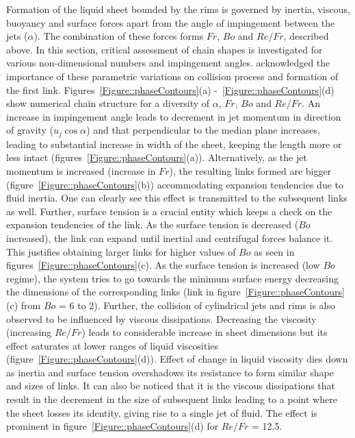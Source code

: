 \documentclass{jfm}
\begin{document}
Formation of the liquid sheet bounded by the rims is governed by inertia, viscous, buoyancy and surface forces apart from the angle of impingement between the jets ($\alpha$). The combination of these forces forms $Fr$, $Bo$ and $Re/Fr$, described above. In this section, critical assessment of chain shapes is investigated for various non-dimensional numbers and impingement angles. \cite{yang2014liquid} acknowledged the importance of these parametric variations on collision process and formation of the first link. Figures~\ref{Figure::phaseContours}(a) -~\ref{Figure::phaseContours}(d) show numerical chain structure for a diversity of $\alpha$, $Fr$, $Bo$ and $Re/Fr$. An increase in impingement angle leads to decrement in jet momentum in direction of gravity ($u_j\cos\alpha$) and that perpendicular to the median plane increases, leading to substantial increase in width of the sheet, keeping the length more or less intact (figures~\ref{Figure::phaseContours}(a)). Alternatively, as the jet momentum is increased (increase in $Fr$), the resulting links formed are bigger (figure~\ref{Figure::phaseContours}(b)) accommodating expansion tendencies due to fluid inertia. One can clearly see this effect is transmitted to the subsequent links as well. Further, surface tension is a crucial entity which keeps a check on the expansion tendencies of the link. As the surface tension is decreased ($Bo$ increased), the link can expand until inertial and centrifugal forces balance it. This justifies obtaining larger links for higher values of $Bo$ as seen in figures~\ref{Figure::phaseContours}(c). As the surface tension is increased (low $Bo$ regime), the system tries to go towards the minimum surface energy decreasing the dimensions of the corresponding links (link in figure~\ref{Figure::phaseContours}(c) from $Bo$ = 6 to 2). Further, the collision of cylindrical jets and rims is also observed to be influenced by viscous dissipations. Decreasing the viscosity (increasing $Re/Fr$) leads to considerable increase in sheet dimensions but its effect saturates at lower ranges of liquid viscosities (figure~\ref{Figure::phaseContours}(d)). Effect of change in liquid viscosity dies down as inertia and surface tension overshadows its resistance to form similar shape and sizes of links. It can also be noticed that it is the viscous dissipations that result in the decrement in the size of subsequent links leading to a point where the sheet losses its identity, giving rise to a single jet of fluid. The effect is prominent in figure~\ref{Figure::phaseContours}(d) for $Re/Fr$ = 12.5.\\
\end{document}
